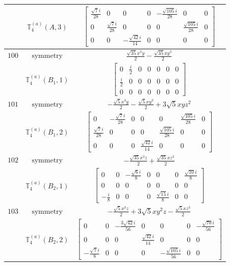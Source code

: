 \documentclass[fleqn,8pt,landscape]{jsarticle}
\begin{document}
\begin{longtable}{ccc}
$  $ & $ \mathbb{T}_{4}^{(a)}(A,3) $ & $ \begin{bmatrix} \frac{\sqrt{7} i}{28} & 0 & 0 & 0 & - \frac{\sqrt{105} i}{28} & 0 & 0 \\ 0 & \frac{\sqrt{7} i}{28} & 0 & 0 & 0 & \frac{\sqrt{105} i}{28} & 0 \\ 0 & 0 & - \frac{\sqrt{42} i}{14} & 0 & 0 & 0 & 0 \end{bmatrix} $ \\ \hline
$ 100 $ & $ \text{symmetry} $ & $ \frac{\sqrt{35} x^{3} y}{2} - \frac{\sqrt{35} x y^{3}}{2} $ \\
$  $ & $ \mathbb{T}_{4}^{(a)}(B_{1},1) $ & $ \begin{bmatrix} 0 & \frac{i}{2} & 0 & 0 & 0 & 0 & 0 \\ \frac{i}{2} & 0 & 0 & 0 & 0 & 0 & 0 \\ 0 & 0 & 0 & 0 & 0 & 0 & 0 \end{bmatrix} $ \\ \hline
$ 101 $ & $ \text{symmetry} $ & $ - \frac{\sqrt{5} x^{3} y}{2} - \frac{\sqrt{5} x y^{3}}{2} + 3 \sqrt{5} x y z^{2} $ \\
$  $ & $ \mathbb{T}_{4}^{(a)}(B_{1},2) $ & $ \begin{bmatrix} 0 & - \frac{\sqrt{7} i}{28} & 0 & 0 & 0 & \frac{\sqrt{105} i}{28} & 0 \\ \frac{\sqrt{7} i}{28} & 0 & 0 & 0 & \frac{\sqrt{105} i}{28} & 0 & 0 \\ 0 & 0 & 0 & \frac{\sqrt{42} i}{14} & 0 & 0 & 0 \end{bmatrix} $ \\ \hline
$ 102 $ & $ \text{symmetry} $ & $ - \frac{\sqrt{35} x^{3} z}{2} + \frac{\sqrt{35} x z^{3}}{2} $ \\
$  $ & $ \mathbb{T}_{4}^{(a)}(B_{2},1) $ & $ \begin{bmatrix} 0 & 0 & - \frac{\sqrt{6} i}{8} & 0 & 0 & 0 & \frac{\sqrt{10} i}{8} \\ 0 & 0 & 0 & 0 & 0 & 0 & 0 \\ - \frac{i}{8} & 0 & 0 & 0 & \frac{\sqrt{15} i}{8} & 0 & 0 \end{bmatrix} $ \\ \hline
$ 103 $ & $ \text{symmetry} $ & $ - \frac{\sqrt{5} x^{3} z}{2} + 3 \sqrt{5} x y^{2} z - \frac{\sqrt{5} x z^{3}}{2} $ \\
$  $ & $ \mathbb{T}_{4}^{(a)}(B_{2},2) $ & $ \begin{bmatrix} 0 & 0 & - \frac{3 \sqrt{42} i}{56} & 0 & 0 & 0 & - \frac{\sqrt{70} i}{56} \\ 0 & 0 & 0 & \frac{\sqrt{42} i}{14} & 0 & 0 & 0 \\ - \frac{\sqrt{7} i}{8} & 0 & 0 & 0 & - \frac{\sqrt{105} i}{56} & 0 & 0 \end{bmatrix} $ \\ \hline

\end{longtable}
\end{document}
